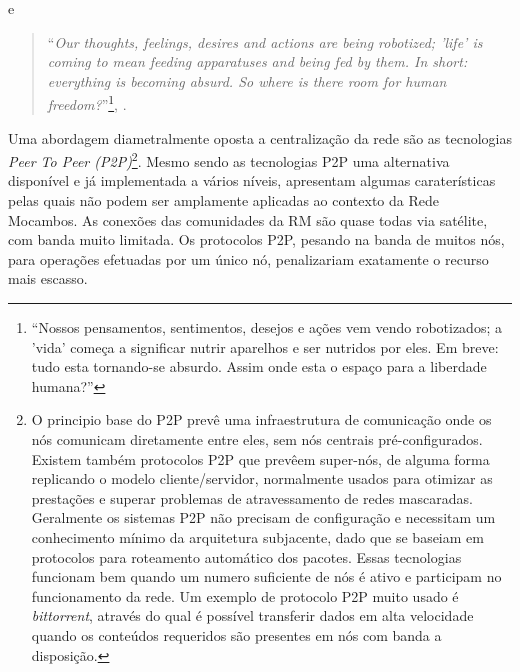 e 

\begin{quote}
  ``\emph{Our thoughts, feelings, desires and actions are being
    robotized; 'life' is coming to mean feeding apparatuses and being
    fed by them. In short: everything is becoming absurd. So where is
    there room for human freedom?}''\footnote{``Nossos pensamentos,
    sentimentos, desejos e ações vem vendo robotizados; a 'vida'
    começa a significar nutrir aparelhos e ser nutridos por eles. Em
    breve: tudo esta tornando-se absurdo. Assim onde esta o espaço
    para a liberdade humana?''}, \citet{flusser1983philosophie}.
\end{quote}

Uma abordagem diametralmente oposta a centralização da rede são as
tecnologias \emph{Peer To Peer (P2P)}\footnote{O principio base do P2P
  prevê uma infraestrutura de comunicação onde os nós comunicam
  diretamente entre eles, sem nós centrais pré-configurados. Existem
  também protocolos P2P que prevêem super-nós, de alguma forma
  replicando o modelo cliente/servidor, normalmente usados para
  otimizar as prestações e superar problemas de atravessamento de
  redes mascaradas. Geralmente os sistemas P2P não precisam de
  configuração e necessitam um conhecimento mínimo da arquitetura
  subjacente, dado que se baseiam em protocolos para roteamento
  automático dos pacotes. Essas tecnologias funcionam bem quando um
  numero suficiente de nós é ativo e participam no funcionamento da
  rede. Um exemplo de protocolo P2P muito usado é \emph{bittorrent},
  através do qual é possível transferir dados em alta velocidade
  quando os conteúdos requeridos são presentes em nós com banda a
  disposição.}. Mesmo sendo as tecnologias P2P uma alternativa
disponível e já implementada a vários níveis, apresentam algumas
caraterísticas pelas quais não podem ser amplamente aplicadas ao
contexto da Rede Mocambos. As conexões das comunidades da RM são quase
todas via satélite, com banda muito limitada. Os protocolos P2P,
pesando na banda de muitos nós, para operações efetuadas por um único
nó, penalizariam exatamente o recurso mais escasso.



